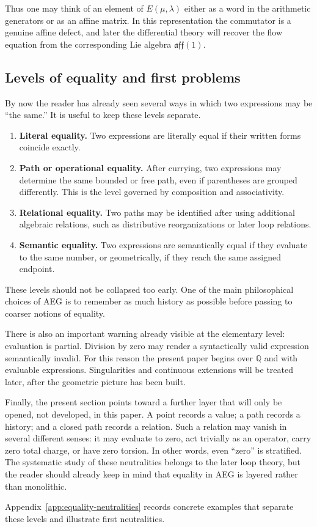 Thus one may think of an element of $E(\mu,\lambda)$ either as a word in the arithmetic generators or as an affine matrix. In this representation the commutator is a genuine affine defect, and later the differential theory will recover the flow equation from the corresponding Lie algebra $\mathfrak{aff}(1)$.

\subsection{Levels of equality and first problems}
\label{subsec:problems-on-equality-singularity-symmetries}

By now the reader has already seen several ways in which two expressions may be ``the same.'' It is useful to keep these levels separate.

\begin{enumerate}
    \item \textbf{Literal equality.} Two expressions are literally equal if their written forms coincide exactly.

    \item \textbf{Path or operational equality.} After currying, two expressions may determine the same bounded or free path, even if parentheses are grouped differently. This is the level governed by composition and associativity.

    \item \textbf{Relational equality.} Two paths may be identified after using additional algebraic relations, such as distributive reorganizations or later loop relations.

    \item \textbf{Semantic equality.} Two expressions are semantically equal if they evaluate to the same number, or geometrically, if they reach the same assigned endpoint.
\end{enumerate}

These levels should not be collapsed too early. One of the main philosophical choices of AEG is to remember as much history as possible before passing to coarser notions of equality.

There is also an important warning already visible at the elementary level: evaluation is partial. Division by zero may render a syntactically valid expression semantically invalid. For this reason the present paper begins over $\mathbb{Q}$ and with evaluable expressions. Singularities and continuous extensions will be treated later, after the geometric picture has been built.

Finally, the present section points toward a further layer that will only be opened, not developed, in this paper. A point records a value; a path records a history; and a closed path records a relation. Such a relation may vanish in several different senses: it may evaluate to zero, act trivially as an operator, carry zero total charge, or have zero torsion. In other words, even ``zero'' is stratified. The systematic study of these neutralities belongs to the later loop theory, but the reader should already keep in mind that equality in AEG is layered rather than monolithic.

Appendix~\ref{app:equality-neutralities} records concrete examples that separate these levels and illustrate first neutralities.
